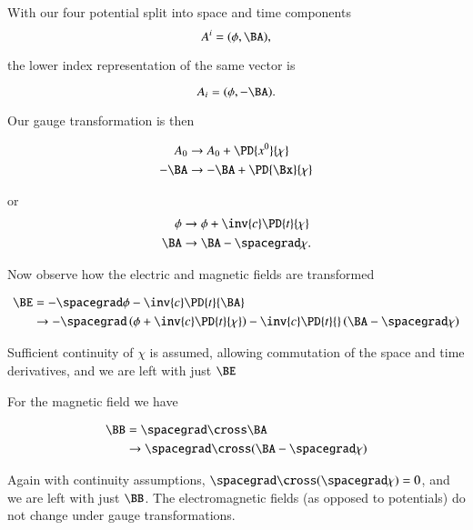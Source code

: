 With our four potential split into space and time components
\begin{equation}\label{eqn:relativisticElectrodynamicsL10:50}
A^i = (\phi, \BA),
\end{equation}

the lower index representation of the same vector is

\begin{equation}\label{eqn:relativisticElectrodynamicsL10:70}
A_i = (\phi, -\BA).
\end{equation}

Our gauge transformation is then

\begin{align}\label{eqn:relativisticElectrodynamicsL10:90}
A_0 &\rightarrow A_0 + \PD{x^0}{\chi} \\
-\BA &\rightarrow -\BA + \PD{\Bx}{\chi}
\end{align}

or
\begin{align}\label{eqn:relativisticElectrodynamicsL10:110}
\phi &\rightarrow \phi + \inv{c}\PD{t}{\chi} \\
\BA &\rightarrow \BA - \spacegrad \chi.
\end{align}

Now observe how the electric and magnetic fields are transformed

\begin{align*}
\BE 
&= - \spacegrad \phi - \inv{c} \PD{t}{\BA} \\
&\rightarrow 
- \spacegrad \left( \phi + \inv{c}\PD{t}{\chi} \right) - \inv{c}\PD{t}{} \left( \BA - \spacegrad \chi \right) \\
\end{align*}

Sufficient continuity of $\chi$ is assumed, allowing commutation of the space and time derivatives, and we are left with just $\BE$

For the magnetic field we have

\begin{align*}
\BB 
&= \spacegrad \cross \BA  \\
&\rightarrow 
\spacegrad \cross (\BA  - \spacegrad \chi) \\
\end{align*}

Again with continuity assumptions, $\spacegrad \cross (\spacegrad \chi) = 0$, and we are left with just $\BB$.  The electromagnetic fields (as opposed to potentials) do not change under gauge transformations.

